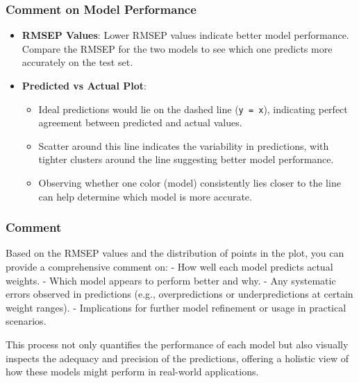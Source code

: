 \documentclass[
]{article}
\providecommand{\tightlist}{%
  \setlength{\itemsep}{0pt}\setlength{\parskip}{0pt}}
\begin{document}
\hypertarget{comment-on-model-performance}{%
\subsubsection{Comment on Model
Performance}\label{comment-on-model-performance}}

\begin{itemize}
\tightlist
\item
  \textbf{RMSEP Values}: Lower RMSEP values indicate better model
  performance. Compare the RMSEP for the two models to see which one
  predicts more accurately on the test set.
\item
  \textbf{Predicted vs Actual Plot}:

  \begin{itemize}
  \tightlist
  \item
    Ideal predictions would lie on the dashed line (\texttt{y\ =\ x}),
    indicating perfect agreement between predicted and actual values.
  \item
    Scatter around this line indicates the variability in predictions,
    with tighter clusters around the line suggesting better model
    performance.
  \item
    Observing whether one color (model) consistently lies closer to the
    line can help determine which model is more accurate.
  \end{itemize}
\end{itemize}

\hypertarget{comment}{%
\subsubsection{Comment}\label{comment}}

Based on the RMSEP values and the distribution of points in the plot,
you can provide a comprehensive comment on: - How well each model
predicts actual weights. - Which model appears to perform better and
why. - Any systematic errors observed in predictions (e.g.,
overpredictions or underpredictions at certain weight ranges). -
Implications for further model refinement or usage in practical
scenarios.

This process not only quantifies the performance of each model but also
visually inspects the adequacy and precision of the predictions,
offering a holistic view of how these models might perform in real-world
applications.
\end{document}
